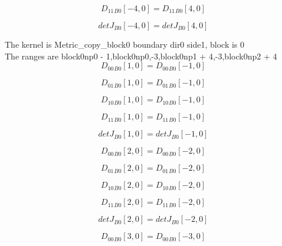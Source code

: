\documentclass{article}
\begin{document}
\begin{dmath}{D_{11}{_{B0}}}[{-4,0}] = {D_{11}{_{B0}}}[{4,0}]\end{dmath}

\begin{dmath}{detJ{_{B0}}}[{-4,0}] = {detJ{_{B0}}}[{4,0}]\end{dmath}

\noindent The kernel is Metric_copy_block0 boundary dir0 side1, block is 0\\\noindent The ranges are block0np0 - 1,block0np0,-3,block0np1 + 4,-3,block0np2 + 4\\\begin{dmath}{D_{00}{_{B0}}}[{1,0}] = {D_{00}{_{B0}}}[{-1,0}]\end{dmath}

\begin{dmath}{D_{01}{_{B0}}}[{1,0}] = {D_{01}{_{B0}}}[{-1,0}]\end{dmath}

\begin{dmath}{D_{10}{_{B0}}}[{1,0}] = {D_{10}{_{B0}}}[{-1,0}]\end{dmath}

\begin{dmath}{D_{11}{_{B0}}}[{1,0}] = {D_{11}{_{B0}}}[{-1,0}]\end{dmath}

\begin{dmath}{detJ{_{B0}}}[{1,0}] = {detJ{_{B0}}}[{-1,0}]\end{dmath}

\begin{dmath}{D_{00}{_{B0}}}[{2,0}] = {D_{00}{_{B0}}}[{-2,0}]\end{dmath}

\begin{dmath}{D_{01}{_{B0}}}[{2,0}] = {D_{01}{_{B0}}}[{-2,0}]\end{dmath}

\begin{dmath}{D_{10}{_{B0}}}[{2,0}] = {D_{10}{_{B0}}}[{-2,0}]\end{dmath}

\begin{dmath}{D_{11}{_{B0}}}[{2,0}] = {D_{11}{_{B0}}}[{-2,0}]\end{dmath}

\begin{dmath}{detJ{_{B0}}}[{2,0}] = {detJ{_{B0}}}[{-2,0}]\end{dmath}

\begin{dmath}{D_{00}{_{B0}}}[{3,0}] = {D_{00}{_{B0}}}[{-3,0}]\end{dmath}
\end{document}
